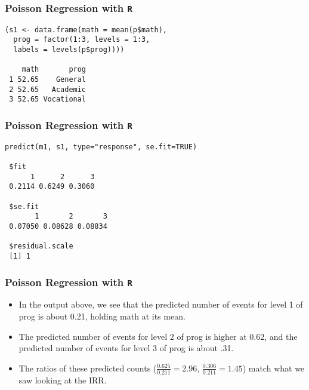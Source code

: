 \documentclass[MASTER.tex]{subfiles}
\begin{document}
\begin{frame}[fragile]

\frametitle{Poisson Regression with \texttt{R}}
\normalsize 

\begin{framed}
\begin{verbatim}
(s1 <- data.frame(math = mean(p$math),
  prog = factor(1:3, levels = 1:3, 
  labels = levels(p$prog))))
 
    math       prog
 1 52.65    General
 2 52.65   Academic
 3 52.65 Vocational
\end{verbatim}
\end{framed}
\end{frame}

\begin{frame}[fragile]

\frametitle{Poisson Regression with \texttt{R}}
\normalsize 

\begin{framed}
\begin{verbatim}
predict(m1, s1, type="response", se.fit=TRUE)
 
 $fit
      1      2      3 
 0.2114 0.6249 0.3060 
 
 $se.fit
       1       2       3 
 0.07050 0.08628 0.08834 
 
 $residual.scale
 [1] 1
\end{verbatim}
\end{framed}
\end{frame}

\begin{frame}[fragile]

\frametitle{Poisson Regression with \texttt{R}}
\Large 
\begin{itemize}
\item 
In the output above, we see that the predicted number of events for level 1 of prog is about 0.21, holding math at its mean.
\item The predicted number of events for level 2 of prog is higher at 0.62, and the predicted number of events for level 
3 of prog is about .31. 
\item The ratios of these predicted counts (\(\frac{0.625}{0.211} = 2.96\), \(\frac{0.306}{0.211} = 1.45\)) match what 
we saw looking at the IRR.
\end{itemize}
\end{frame}
\end{document}
